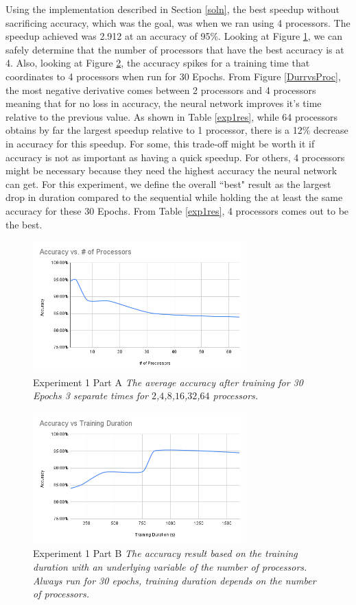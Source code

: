 \documentclass[11pt,twocolumn]{article}
\begin{document}
Using the implementation described in Section \ref{soln}, the best speedup without sacrificing accuracy, which was the goal, was when we ran using 4 processors. The speedup achieved was 2.912 at an accuracy of 95\%. Looking at Figure \ref{AccvsProcs}, we can safely determine that the number of processors that have the best accuracy is at 4. Also, looking at Figure \ref{AccvsDur}, the accuracy spikes for a training time that coordinates to 4 processors when run for 30 Epochs. From Figure \ref{DurrvsProc}, the most negative derivative comes between 2 processors and 4 processors meaning that for no loss in accuracy, the neural network improves it's time relative to the previous value. As shown in Table \ref{exp1res}, while 64 processors obtains by far the largest speedup relative to 1 processor, there is a 12\% decrease in accuracy for this speedup. For some, this trade-off might be worth it if accuracy is not as important as having a quick speedup. For others, 4 processors might be necessary because they need the highest accuracy the neural network can get. For this experiment, we define the overall ``best" result as the largest drop in duration compared to the sequential while holding the at least the same accuracy for these 30 Epochs. From Table \ref{exp1res}, 4 processors comes out to be the best. 


    
\begin{figure}[t]
    \centerline{
        \includegraphics[height=2in]{Accuracy vs. num of Processors.png}
    }
    \caption{\label{AccvsProcs}Experiment 1 Part A {\em The average accuracy after training for 30 Epochs 3 separate times for $2$,$4$,$8$,$16$,$32$,$64$ processors.}}
\end{figure}

\begin{figure}[t]
    \centerline{
        \includegraphics[height=2in]{Accuracy vs Training Duration.png}
    }
    \caption{\label{AccvsDur}  Experiment 1 Part B {\em The accuracy result based on the training duration with an underlying variable of the number of processors. Always run for 30 epochs, training duration depends on the number of processors.}
    }
\end{figure}
\end{document}
